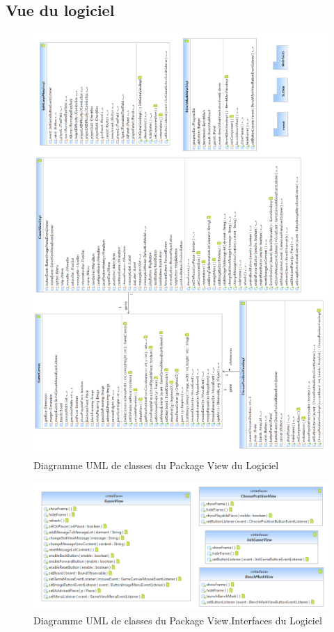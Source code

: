 \documentclass[a4paper,12pt]{report}
\begin{document}
\subsection{Vue du logiciel}
\label{OthKerView}
\begin{figure}[H]
\centering
 \includegraphics[scale=0.45]{Kernel/Pack_com_view.png}
\caption{Diagramme UML de classes du Package View du Logiciel}
\end{figure}

\label{OthKerViewInterfaces}
\begin{figure}[H]
\centering
 \includegraphics[scale=0.5]{Kernel/Pack_com_view_interfaces.png}
\caption{Diagramme UML de classes du Package View.Interfaces du Logiciel}
\end{figure}
\end{document}
